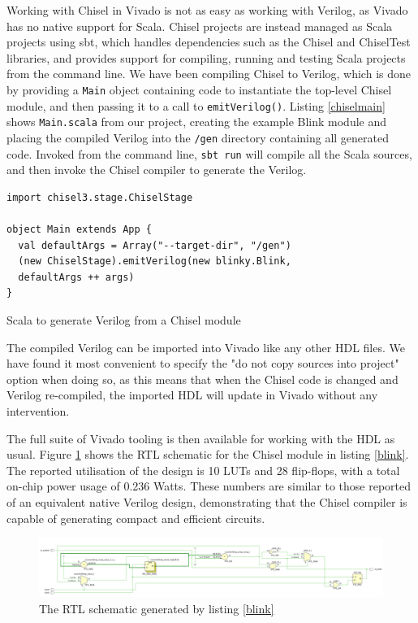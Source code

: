 \documentclass[a4paper,fleqn,12pt]{article}
\begin{document}
Working with Chisel in Vivado is not as easy as working with Verilog, as Vivado has no native support for Scala. Chisel projects are instead managed as Scala projects using sbt, which handles dependencies such as the Chisel and ChiselTest libraries, and provides support for compiling, running and testing Scala projects from the command line. We have been compiling Chisel to Verilog, which is done by providing a \texttt{Main} object containing code to instantiate the top-level Chisel module, and then passing it to a call to \texttt{emitVerilog()}. Listing \ref{chiselmain} shows \texttt{Main.scala} from our project, creating the example Blink module and placing the compiled Verilog into the \texttt{/gen} directory containing all generated code. Invoked from the command line, \texttt{sbt run} will compile all the Scala sources, and then invoke the Chisel compiler to generate the Verilog.

\begin{listing}[]
	\vspace{0.5cm}
	\begin{verbatim}
import chisel3.stage.ChiselStage

object Main extends App {
  val defaultArgs = Array("--target-dir", "/gen")
  (new ChiselStage).emitVerilog(new blinky.Blink,
  defaultArgs ++ args)
}
    \end{verbatim}
	\caption{Scala to generate Verilog from a Chisel module}
	\label{chiselmain}
\end{listing}

The compiled Verilog can be imported into Vivado like any other HDL files. We have found it most convenient to specify the "do not copy sources into project" option when doing so, as this means that when the Chisel code is changed and Verilog re-compiled, the imported HDL will update in Vivado without any intervention.

The full suite of Vivado tooling is then available for working with the HDL as usual. Figure \ref{fig:rtl} shows the RTL schematic for the Chisel module in listing \ref{blink}. The reported utilisation of the design is 10 LUTs and 28 flip-flops, with a total on-chip power usage of 0.236 Watts. These numbers are similar to those reported of an equivalent native Verilog design, demonstrating that the Chisel compiler is capable of generating compact and efficient circuits.

\begin{figure}[h!]
	\centering
	\includegraphics[width=\textwidth]{../img/blinky-rtl.png}
	\caption{The RTL schematic generated by listing \ref{blink}}
	\label{fig:rtl}
\end{figure}
\end{document}
